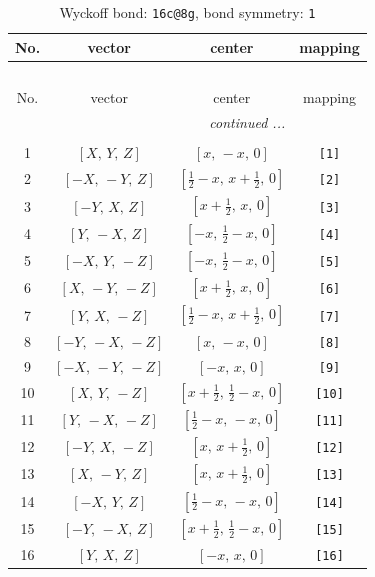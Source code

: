 \documentclass[fleqn,8pt]{jsarticle}
\begin{document}
\begin{longtable}{cccc}
\caption{Wyckoff bond: {\tt 16c@8g}, bond symmetry: {\tt 1}}
 \\
 \hline \hline
No. & vector & center & mapping \\ \hline \endfirsthead

\multicolumn{3}{l}{\tablename\ \thetable{}} \\
 \hline \hline
No. & vector & center & mapping \\ \hline \endhead

 \hline \hline
\multicolumn{3}{r}{\footnotesize\it continued ...} \\ \endfoot

 \hline \hline
\multicolumn{3}{r}{} \\ \endlastfoot

1 & $\left[ X,\, Y,\, Z \right]$ & $\left[ x,\, - x,\, 0 \right]$ & {\tt [1]} \\ \hline
2 & $\left[ - X,\, - Y,\, Z \right]$ & $\left[ \frac{1}{2} - x,\, x + \frac{1}{2},\, 0 \right]$ & {\tt [2]} \\ \hline
3 & $\left[ - Y,\, X,\, Z \right]$ & $\left[ x + \frac{1}{2},\, x,\, 0 \right]$ & {\tt [3]} \\ \hline
4 & $\left[ Y,\, - X,\, Z \right]$ & $\left[ - x,\, \frac{1}{2} - x,\, 0 \right]$ & {\tt [4]} \\ \hline
5 & $\left[ - X,\, Y,\, - Z \right]$ & $\left[ - x,\, \frac{1}{2} - x,\, 0 \right]$ & {\tt [5]} \\ \hline
6 & $\left[ X,\, - Y,\, - Z \right]$ & $\left[ x + \frac{1}{2},\, x,\, 0 \right]$ & {\tt [6]} \\ \hline
7 & $\left[ Y,\, X,\, - Z \right]$ & $\left[ \frac{1}{2} - x,\, x + \frac{1}{2},\, 0 \right]$ & {\tt [7]} \\ \hline
8 & $\left[ - Y,\, - X,\, - Z \right]$ & $\left[ x,\, - x,\, 0 \right]$ & {\tt [8]} \\ \hline
9 & $\left[ - X,\, - Y,\, - Z \right]$ & $\left[ - x,\, x,\, 0 \right]$ & {\tt [9]} \\ \hline
10 & $\left[ X,\, Y,\, - Z \right]$ & $\left[ x + \frac{1}{2},\, \frac{1}{2} - x,\, 0 \right]$ & {\tt [10]} \\ \hline
11 & $\left[ Y,\, - X,\, - Z \right]$ & $\left[ \frac{1}{2} - x,\, - x,\, 0 \right]$ & {\tt [11]} \\ \hline
12 & $\left[ - Y,\, X,\, - Z \right]$ & $\left[ x,\, x + \frac{1}{2},\, 0 \right]$ & {\tt [12]} \\ \hline
13 & $\left[ X,\, - Y,\, Z \right]$ & $\left[ x,\, x + \frac{1}{2},\, 0 \right]$ & {\tt [13]} \\ \hline
14 & $\left[ - X,\, Y,\, Z \right]$ & $\left[ \frac{1}{2} - x,\, - x,\, 0 \right]$ & {\tt [14]} \\ \hline
15 & $\left[ - Y,\, - X,\, Z \right]$ & $\left[ x + \frac{1}{2},\, \frac{1}{2} - x,\, 0 \right]$ & {\tt [15]} \\ \hline
16 & $\left[ Y,\, X,\, Z \right]$ & $\left[ - x,\, x,\, 0 \right]$ & {\tt [16]} \\
\end{longtable}
\end{document}
